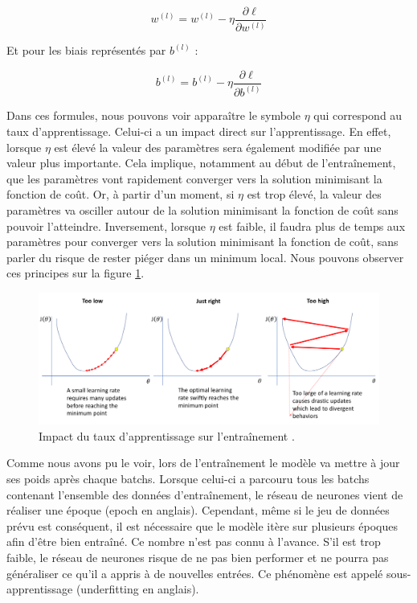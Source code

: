 \[w^{(l)}=w^{(l)}-\eta{}\frac{\partial{}\ell}{\partial{}w^{(l)}}\]

Et pour les biais représentés par $b^{(l)}$ :

\[b^{(l)}=b^{(l)}-\eta{}\frac{\partial{}\ell}{\partial{}b^{(l)}}\]

Dans ces formules, nous pouvons voir apparaître le symbole $\eta$ qui correspond au taux d'apprentissage. Celui-ci a un impact direct sur l'apprentissage. En effet, lorsque $\eta$ est élevé la valeur des paramètres sera également modifiée par une valeur plus importante. Cela implique, notamment au début de l'entraînement, que les paramètres vont rapidement converger vers la solution minimisant la fonction de coût. Or, à partir d'un moment, si $\eta$ est trop élevé, la valeur des paramètres va osciller autour de la solution minimisant la fonction de coût sans pouvoir l'atteindre. Inversement, lorsque $\eta$ est faible, il faudra plus de temps aux paramètres pour converger vers la solution minimisant la fonction de coût, sans parler du risque de rester piéger dans un minimum local. Nous pouvons observer ces principes sur la figure \ref{fig:learning_rate_choice}.

\begin{figure}[hbt!]
    \centering
    \includegraphics[scale=0.3]{Figures/learning_rate_choice.png}
    \caption{Impact du taux d'apprentissage sur l'entraînement \cite{noauthor_learning_rate_choicepng_nodate}.}
    \label{fig:learning_rate_choice}
\end{figure}

Comme nous avons pu le voir, lors de l'entraînement le modèle va mettre à jour ses poids après chaque batchs. Lorsque celui-ci a parcouru tous les batchs contenant l'ensemble des données d'entraînement, le réseau de neurones vient de réaliser une époque (epoch en anglais). Cependant, même si le jeu de données prévu est conséquent, il est nécessaire que le modèle itère sur plusieurs époques afin d'être bien entraîné. Ce nombre n'est pas connu à l'avance. S'il est trop faible, le réseau de neurones risque de ne pas bien performer et ne pourra pas généraliser ce qu'il a appris à de nouvelles entrées. Ce phénomène est appelé sous-apprentissage (underfitting en anglais).

